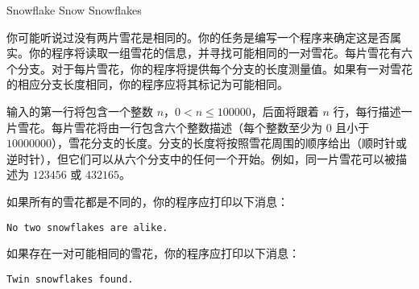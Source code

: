 Snowflake Snow Snowflakes

你可能听说过没有两片雪花是相同的。你的任务是编写一个程序来确定这是否属实。你的程序将读取一组雪花的信息，并寻找可能相同的一对雪花。每片雪花有六个分支。对于每片雪花，你的程序将提供每个分支的长度测量值。如果有一对雪花的相应分支长度相同，你的程序应将其标记为可能相同。

输入的第一行将包含一个整数 $n$，$0 < n \le 100000$，后面将跟着 $n$ 行，每行描述一片雪花。每片雪花将由一行包含六个整数描述（每个整数至少为 $0$ 且小于 $10000000$），雪花分支的长度。分支的长度将按照雪花周围的顺序给出（顺时针或逆时针），但它们可以从六个分支中的任何一个开始。例如，同一片雪花可以被描述为 $1 2 3 4 5 6$ 或 $4 3 2 1 6 5$。

如果所有的雪花都是不同的，你的程序应打印以下消息：

\texttt{No two snowflakes are alike.}

如果存在一对可能相同的雪花，你的程序应打印以下消息：

\texttt{Twin snowflakes found.}